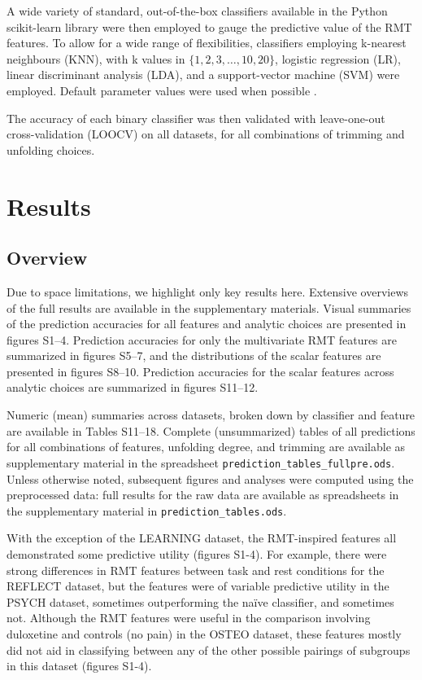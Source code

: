 \documentclass[10pt]{article}
\begin{document}
A wide variety of standard, out-of-the-box classifiers available in the Python scikit-learn library
\citep{pedregosaScikitlearnMachineLearning2011} were then employed to gauge the predictive value of
the RMT features. To allow for a wide range of flexibilities, classifiers employing k-nearest
neighbours (KNN), with k values in \(\{1, 2, 3, \dots, 10, 20\}\), logistic regression (LR), linear
discriminant analysis (LDA), and a support-vector machine (SVM) were employed. Default parameter
values were used when possible \citep[see][for precise function calls used]{bergerderekm.DMBergerRandommatrixfmriV02020}.

The accuracy of each binary classifier was then validated with leave-one-out cross-validation
(LOOCV) on all datasets, for all combinations of trimming and unfolding choices.

\section{Results}

\subsection{Overview}
Due to space limitations, we highlight only key results here. Extensive overviews of the full
results are available in the supplementary materials. Visual summaries of the prediction accuracies
for all features and analytic choices are presented in figures S1--4. Prediction accuracies for only the
multivariate RMT features are summarized in figures S5--7, and the distributions of the scalar features
are presented in figures S8--10. Prediction accuracies for the scalar features across analytic choices
are summarized in figures S11--12.

Numeric (mean) summaries across datasets, broken down by classifier and feature are available in
Tables S11--18. Complete (unsummarized) tables of all predictions for all combinations of features,
unfolding degree, and trimming are available as supplementary material in the spreadsheet
\texttt{prediction\_tables\_fullpre.ods}. Unless otherwise noted, subsequent figures and analyses were
computed using the preprocessed data: full results for the raw data are available as spreadsheets in
the supplementary material in \texttt{prediction\_tables.ods}.

With the exception of the LEARNING dataset, the RMT-inspired features all demonstrated some
predictive utility (figures S1-4). For example, there were strong differences in RMT features between
task and rest conditions for the REFLECT dataset, but the features were of variable predictive
utility in the PSYCH dataset, sometimes outperforming the naïve classifier, and sometimes not.
Although the RMT features were useful in the comparison involving duloxetine and controls (no pain)
in the OSTEO dataset, these features mostly did not aid in classifying between any of the other
possible pairings of subgroups in this dataset (figures S1-4).
\end{document}

